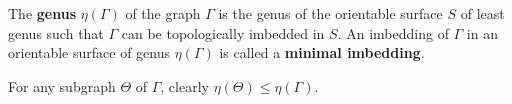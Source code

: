 The \textbf{genus} $\eta(\Gamma)$ of the graph $\Gamma$ is the genus of the orientable surface $S$ of least genus such that $\Gamma$ can be topologically imbedded in $S$. An imbedding of $\Gamma$ in an orientable surface of genus $\eta(\Gamma)$ is called a \textbf{minimal imbedding}.

For any subgraph $\Theta$ of $\Gamma$, clearly $\eta(\Theta) \leq \eta(\Gamma)$.
